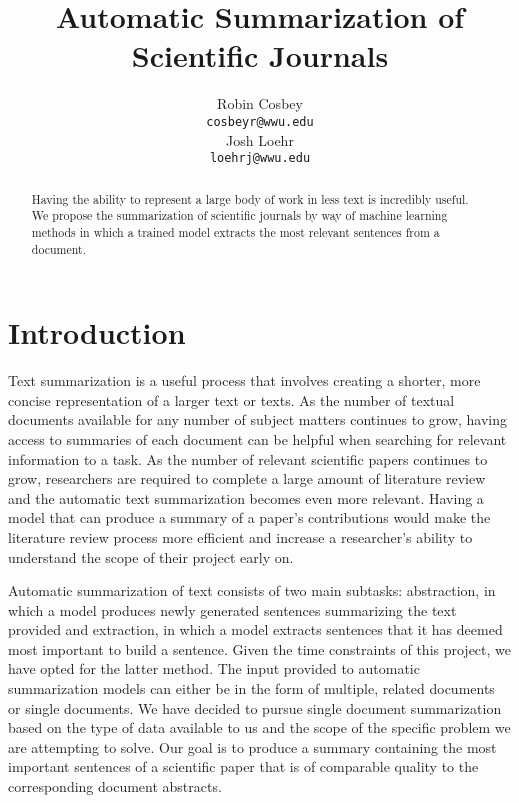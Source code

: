 \documentclass[11pt]{article}
\begin{document}
\title{Automatic Summarization of Scientific Journals}

\author{Robin Cosbey \\
  {\tt cosbeyr@wwu.edu} \\\And
  Josh Loehr \\
  {\tt loehrj@wwu.edu} \\}

\maketitle

\begin{abstract}
  Having the ability to represent a large body of work in less text is incredibly useful. We propose the summarization of scientific journals by way of machine learning methods in which a trained model extracts the most relevant sentences from a document. 
\end{abstract}

\section{Introduction}
	Text summarization is a useful process that involves creating a shorter, more concise representation of a larger text or texts. As the number of textual documents available for any number of subject matters continues to grow, having access to summaries of each document can be helpful when searching for relevant information to a task. As the number of relevant scientific papers continues to grow, researchers are required to complete a large amount of literature review and the automatic text summarization becomes even more relevant. Having a model that can produce a summary of a paper’s contributions would make the literature review process more efficient and increase a researcher’s ability to understand the scope of their project early on. 

	Automatic summarization of text consists of two main subtasks: abstraction, in which a model produces newly generated sentences summarizing the text provided and extraction, in which a model extracts sentences that it has deemed most important to build a sentence. Given the time constraints of this project, we have opted for the latter method. The input provided to automatic summarization models can either be in the form of multiple, related documents or single documents. We have decided to pursue single document summarization based on the type of data available to us and the scope of the specific problem we are attempting to solve. Our goal is to produce a summary containing the most important sentences of a scientific paper that is of comparable quality to the corresponding document abstracts. 
	
\end{document}
